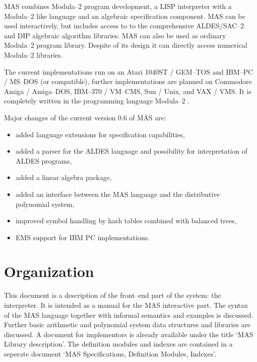 MAS combines Modula--2 program development, 
a LISP interpreter with a Modula--2 like language and 
an algebraic specification component.
MAS can be used interactively, but includes access to
to the comprehensive ALDES/SAC--2 and DIP 
algebraic algorithm libraries. 
MAS can also be used as ordinary Modula--2 program library.
Despite of its design it can directly access 
numerical Modula--2 libraries. 

The current implementations run on an 
Atari 1040ST / GEM--TOS and 
IBM--PC / MS--DOS (or compatible),
further implementations are planned on  
Commodore Amiga / Amiga--DOS,
IBM--370 / VM--CMS, Sun / Unix, and VAX / VMS.
It is completely written in the programming language 
Modula--2 \cite{Wirth 85a}.

Major changes of the current version 0.6 of MAS are:
\begin{itemize}
\item added language extensions for specification capabilities,
\item added a parser for the ALDES language and 
      possibility for interpretation of ALDES programs,
\item added a linear algebra package,
\item added an interface between the MAS language 
      and the distributive polynomial system,
\item improved symbol handling by hash tables 
      combined with balanced trees,
\item EMS support for IBM PC implementations.
\end{itemize}


\section*{Organization}

This document is a description of the front--end part of the system:
the interpreter. It is intended as a manual for 
the MAS interactive part. The syntax of the 
MAS language together with informal semantics 
and examples is discussed. 
Further basic arithmetic and polynomial system 
data structures and libraries are discussed. 
A document for implementors is already available 
under the title `MAS Library description'. 
The definition modules and indexes are contained 
in a seperate document 
`MAS Specifications, Definition Modules, Indexes'.

